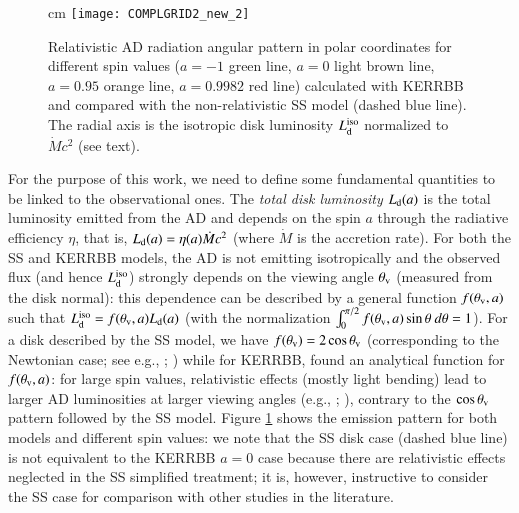 \documentclass[]{aa}
\begin{document}
\begin{figure}
\centering
{} cm
\texttt{[image: COMPLGRID2\_new\_2]}
\caption{Relativistic AD radiation angular pattern in polar coordinates for different spin values ($a=-1$ green line, $a=0$ light brown line, $a=0.95$ orange line, $a=0.9982$ red line) calculated with KERRBB and compared with the non-relativistic SS model (dashed blue line). The radial axis is the isotropic disk luminosity $L^{\rm iso}_{\rm d}$ normalized to $\dot{M} c^2$ (see text).} 
\label{gridpattern}
\end{figure}

For the purpose of this work, we need to define some fundamental quantities to be linked to the observational ones. The \textit{total disk luminosity} $L_{\rm d}(a)$ is the total luminosity emitted from the AD and depends on the spin $a$ through the radiative efficiency $\eta$, that is, $L_{\rm d}(a) = \eta(a) \dot{M} c^2$ (where $\dot{M}$ is the accretion rate). For both the SS and KERRBB models, the AD is not emitting isotropically and the observed flux (and hence $L^{\rm iso}_{\rm d}$) strongly depends on the viewing angle $\theta_{\rm v}$ (measured from the disk normal): this dependence can be described by a general function $f(\theta_{\rm v},a)$ such that $L^{\rm iso}_{\rm d} = f(\theta_{\rm v},a) L_{\rm d}(a)$ (with the normalization $\int^{\pi/2}_{0} f(\theta_{\rm v}, a) \sin \theta\ d \theta = 1$). For a disk described by the SS model, we have $f(\theta_{\rm v}) = 2 \cos \theta_{\rm v}$ (corresponding to the Newtonian case; see e.g., \citealt{Cunnin}; \citealt{Caldero}) while for KERRBB, \citet{Campiti} found an analytical function for $f(\theta_{\rm v},a)$: for large spin values, relativistic effects (mostly light bending) lead to larger AD luminosities at larger viewing angles (e.g., \citealt{Campiti}; \citealt{Ishi}), contrary to the $\cos \theta_{\rm v}$ pattern followed by the SS model. Figure \ref{gridpattern} shows the emission pattern for both models and different spin values: we note that the SS disk case (dashed blue line) is not equivalent to the KERRBB $a = 0$ case because there are relativistic effects neglected in the SS simplified treatment; it is, however, instructive to consider the SS case for comparison with other studies in the literature. 
\end{document}
